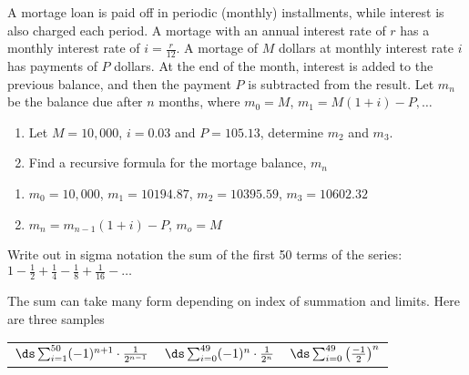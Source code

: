 \begin{questions}
 A mortage loan is paid off in periodic (monthly) installments, while interest is also charged each period.  A mortage with an annual interest rate of $r$ has a monthly interest rate of $i = \frac{r}{12}$.  A mortage of $M$ dollars at monthly interest rate $i$ has payments of $P$ dollars.  At the end of the month, interest is added to the previous balance, and then the payment $P$ is subtracted from the result.  Let $m_n$ be the balance due after $n$ months, where $m_0 = M$, $m_1 = M(1+i) - P, \ldots$
\begin{enumerate}[label=(\alph*),itemsep=0pt,parsep=0pt,
    topsep=0pt,partopsep=0pt]
    \item Let $M = 10,000$, $i = 0.03$ and $P = 105.13$, determine $m_2$ and $m_3$.
    \item Find a recursive formula for the mortage balance, $m_n$
\end{enumerate}
    \ifprintanswers
        \vspace{-10pt}
   \fi
\begin{solution}
    \begin{enumerate}[label=(\alph*),itemsep=0pt,parsep=0pt,
    topsep=0pt,partopsep=0pt]
        \item $m_0 = 10,000$, $m_1 = 10194.87$, $m_2 = 10395.59$, $m_3 =  10602.32$
        \item $m_n = m_{n-1}(1+i) - P$, $m_o = M$
    \end{enumerate}
\end{solution}



 Write out in sigma notation the sum of the first 50 terms of the series: \\
\hspace*{0.2in} $1 - \frac{1}{2} + \frac{1}{4} - \frac{1}{8} + \frac{1}{16} - \ldots$
    \ifprintanswers
        \vspace{-10pt}
   \fi
\begin{solution}
    The sum can take many form depending on index of summation and limits.  Here are three samples
    
    \begin{center}
    \begin{tabular}{ccc}
        $\ds \sum_{i=1}^{50} (-1)^{n+1}\cdot\frac{1}{2^{n-1}}$ \hspace{0.25in}
        & $\ds \sum_{i=0}^{49} (-1)^{n}\cdot\frac{1}{2^{n}}$ \hspace{0.2in}
        & $\ds \sum_{i=0}^{49} \left(\frac{-1}{2}\right)^n$
    \end{tabular}
    \end{center}
\end{solution}  




\end{questions}
